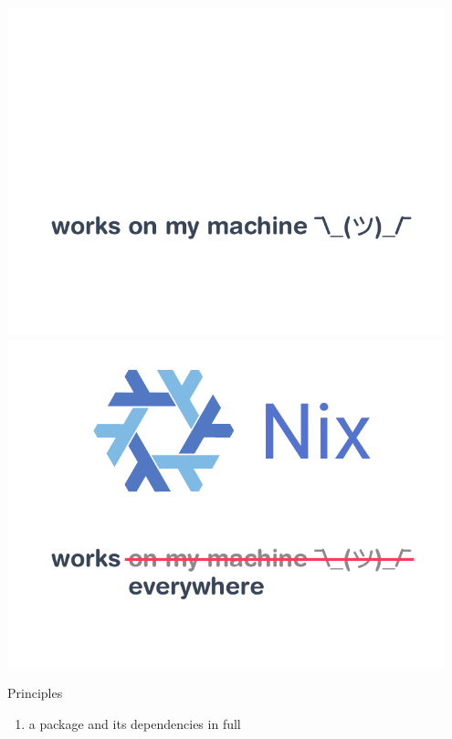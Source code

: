 \documentclass[t, aspectratio=169]{beamer}
\newcommand{\couleur}[2]{{\color{#1}{#2}}}
\begin{document}
\begin{frame}
     {
        \includegraphics[width=0.95\textwidth]{img/schema-nix-motto-pre.pdf}
    }
     {
        \includegraphics[width=0.95\textwidth]{img/schema-nix-motto.pdf}
    }
\end{frame}

\begin{frame}
    \begin{block}{Principles}
        \begin{enumerate}
            \item<2-> \couleur{blue-portage}{Describe} a package and its
                dependencies in full
         \end{enumerate}
    \end{block}
\end{frame}
\end{document}
